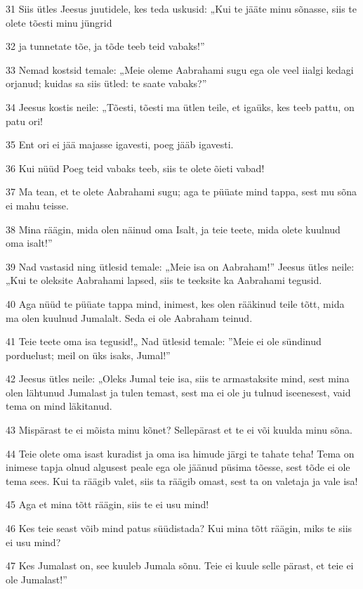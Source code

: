 \par 31 Siis ütles Jeesus juutidele, kes teda uskusid: „Kui te jääte minu sõnasse, siis te olete tõesti minu jüngrid
\par 32 ja tunnetate tõe, ja tõde teeb teid vabaks!”
\par 33 Nemad kostsid temale: „Meie oleme Aabrahami sugu ega ole veel iialgi kedagi orjanud; kuidas sa siis ütled: te saate vabaks?”
\par 34 Jeesus kostis neile: „Tõesti, tõesti ma ütlen teile, et igaüks, kes teeb pattu, on patu ori!
\par 35 Ent ori ei jää majasse igavesti, poeg jääb igavesti.
\par 36 Kui nüüd Poeg teid vabaks teeb, siis te olete õieti vabad!
\par 37 Ma tean, et te olete Aabrahami sugu; aga te püüate mind tappa, sest mu sõna ei mahu teisse.
\par 38 Mina räägin, mida olen näinud oma Isalt, ja teie teete, mida olete kuulnud oma isalt!”
\par 39 Nad vastasid ning ütlesid temale: „Meie isa on Aabraham!” Jeesus ütles neile: „Kui te oleksite Aabrahami lapsed, siis te teeksite ka Aabrahami tegusid.
\par 40 Aga nüüd te püüate tappa mind, inimest, kes olen rääkinud teile tõtt, mida ma olen kuulnud Jumalalt. Seda ei ole Aabraham teinud.
\par 41 Teie teete oma isa tegusid!„ Nad ütlesid temale: ”Meie ei ole sündinud porduelust; meil on üks isaks, Jumal!”
\par 42 Jeesus ütles neile: „Oleks Jumal teie isa, siis te armastaksite mind, sest mina olen lähtunud Jumalast ja tulen temast, sest ma ei ole ju tulnud iseenesest, vaid tema on mind läkitanud.
\par 43 Mispärast te ei mõista minu kõnet? Sellepärast et te ei või kuulda minu sõna.
\par 44 Teie olete oma isast kuradist ja oma isa himude järgi te tahate teha! Tema on inimese tapja olnud algusest peale ega ole jäänud püsima tõesse, sest tõde ei ole tema sees. Kui ta räägib valet, siis ta räägib omast, sest ta on valetaja ja vale isa!
\par 45 Aga et mina tõtt räägin, siis te ei usu mind!
\par 46 Kes teie seast võib mind patus süüdistada? Kui mina tõtt räägin, miks te siis ei usu mind?
\par 47 Kes Jumalast on, see kuuleb Jumala sõnu. Teie ei kuule selle pärast, et teie ei ole Jumalast!”
